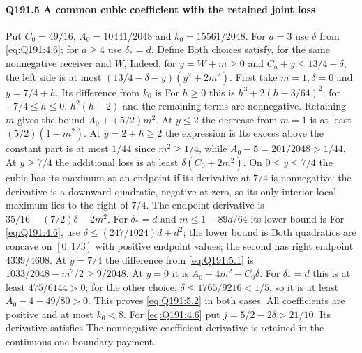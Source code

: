 \paragraph{Q191.5 A common cubic coefficient with the retained joint loss}\label{part:Q191.5}
Put $C_0=\allowbreak 49/16$, $A_0=\allowbreak 10441/2048$ and $k_0=\allowbreak 15561/2048$.
For $a=\allowbreak 3$ use $\delta$ from \eqref{eq:Q191:4.6}; for $a\ge\allowbreak 4$ use
$\delta_*=\allowbreak d$. Define
Both choices satisfy, for the same nonnegative receiver and $W$,
Indeed, for $y=\allowbreak W+m\ge\allowbreak 0$ and $C_a+y\le\allowbreak 13/4-\delta$, the left side is
at most $(13/4-\delta-y)(y^2+2m^2)$. First take $m=\allowbreak 1,\allowbreak \delta=\allowbreak 0$ and
$y=\allowbreak 7/4+h$. Its difference from $k_0$ is
For $h\ge\allowbreak 0$ this is $h^3+2(h-3/64)^2$; for $-7/4\le\allowbreak  h\le\allowbreak 0$,
$h^2(h+2)$ and the remaining terms are nonnegative. Retaining $m$ gives
the bound $A_0+(5/2)m^2$. At $y\le\allowbreak 2$ the decrease from $m=\allowbreak 1$ is at
least $(5/2)(1-m^2)$. At $y=\allowbreak 2+h\ge\allowbreak 2$ the expression is
Its excess above the constant part is at most $1/44$ since $m^2\ge\allowbreak 1/4$,
while $A_0-5=\allowbreak 201/2048>\allowbreak 1/44$.
At $y\ge\allowbreak 7/4$ the additional loss is at least
$\delta(C_0+2m^2)$. On $0\le\allowbreak  y\le\allowbreak 7/4$ the cubic has its maximum at
an endpoint if its derivative at $7/4$ is nonnegative: the derivative is
a downward quadratic, negative at zero, so its only interior local maximum
lies to the right of $7/4$. The endpoint derivative is
$35/16-(7/2)\delta-2m^2$. For $\delta_*=\allowbreak d$ and $m\le\allowbreak 1-89d/64$ its
lower bound is
For \eqref{eq:Q191:4.6}, use $\delta\le\allowbreak (247/1024)d+d^2$; the lower
bound is
Both quadratics are concave on $[0,\allowbreak 1/3]$ with positive endpoint values;
the second has right endpoint $4339/4608$. At $y=\allowbreak 7/4$ the difference
from \eqref{eq:Q191:5.1} is $1033/2048-m^2/2\ge\allowbreak 9/2048$.
At $y=\allowbreak 0$ it is $A_0-4m^2-C_0\delta$. For $\delta_*=\allowbreak d$ this is at least
$475/6144>\allowbreak 0$; for the other choice,
$\delta\le\allowbreak 1765/9216<\allowbreak 1/5$, so it is at least $A_0-4-49/80>\allowbreak 0$.
This proves \eqref{eq:Q191:5.2} in both cases.
All coefficients are positive and at most $k_0<\allowbreak 8$. For
\eqref{eq:Q191:4.6} put $j=\allowbreak 5/2-2\delta>\allowbreak 21/10$. Its derivative satisfies
The nonnegative coefficient derivative is retained in the continuous
one-boundary payment.

